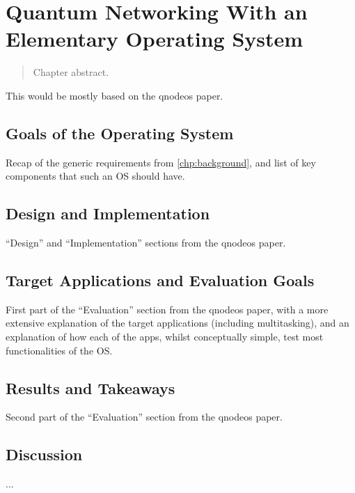 \chapter{Quantum Networking With an Elementary Operating System}
\label{chp:qnodeos}

\begin{abstract}
Chapter abstract.
\end{abstract}


\newpage


\noindent
This would be mostly based on the \acrshort{qnodeos} paper.

\section{Goals of the Operating System}

Recap of the generic requirements from \cref{chp:background}, and list of key components that such
an OS should have.

\section{Design and Implementation}

``Design'' and ``Implementation'' sections from the \acrshort{qnodeos} paper.

\section{Target Applications and Evaluation Goals}

First part of the ``Evaluation'' section from the \acrshort{qnodeos} paper, with a more extensive
explanation of the target applications (including multitasking), and an explanation of how each of
the apps, whilst conceptually simple, test most functionalities of the OS.

\section{Results and Takeaways}

Second part of the ``Evaluation'' section from the \acrshort{qnodeos} paper.

\section{Discussion}

...

\printbibliography[heading=subbibintoc,title={References}]
